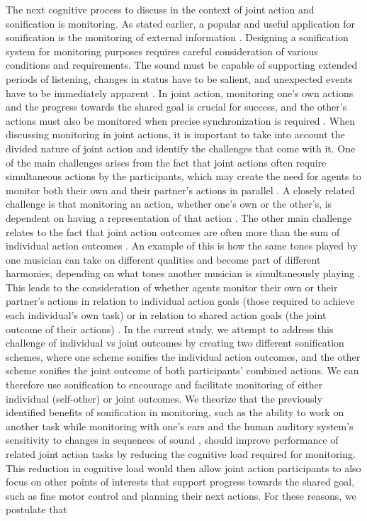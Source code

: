 \documentclass[10pt,a4paper,onecolumn]{article}
\begin{document}
The next cognitive process to discuss in the context of joint action and sonification is monitoring. As stated earlier, a popular and useful application for sonification is the monitoring of external information \autocite{dubusSystematicReviewMapping2013}. Designing a sonification system for monitoring purposes requires careful consideration of various conditions and requirements. The sound must be capable of supporting extended periods of listening, changes in status have to be salient, and unexpected events have to be immediately apparent \autocite{kimotoDesignImplementationStetho2002}. In joint action, monitoring one's own actions and the progress towards the shared goal is crucial for success, and the other's actions must also be monitored when precise synchronization is required \autocite{vesperMinimalArchitectureJoint2010}. When discussing monitoring in joint actions, it is important to take into account the divided nature of joint action and identify the challenges that come with it. One of the main challenges arises from the fact that joint actions often require simultaneous actions by the participants, which may create the need for agents to monitor both their own and their partner's actions in parallel \autocite{loehrMonitoringIndividualJoint2013}. A closely related challenge is that monitoring an action, whether one's own or the other's, is dependent on having a representation of that action \autocite{knoblichPsychologicalResearchJoint2011}. The other main challenge relates to the fact that joint action outcomes are often more than the sum of individual action outcomes \autocite{loehrMonitoringIndividualJoint2013}. An example of this is how the same tones played by one musician can take on different qualities and become part of different harmonies, depending on what tones another musician is simultaneously playing \autocite{loehrMonitoringIndividualJoint2013}. This leads to the consideration of whether agents monitor their own or their partner's actions in relation to individual action goals (those required to achieve each individual's own task) or in relation to shared action goals (the joint outcome of their actions) \autocite{loehrMonitoringIndividualJoint2013}. In the current study, we attempt to address this challenge of individual vs joint outcomes by creating two different sonification schemes, where one scheme sonifies the individual action outcomes, and the other scheme sonifies the joint outcome of both participants' combined actions. We can therefore use sonification to encourage and facilitate monitoring of either individual (self-other) or joint outcomes. We theorize that the previously identified benefits of sonification in monitoring, such as the ability to work on another task while monitoring with one's ears \autocite{vickersSonificationProcessMonitoring} and the human auditory system's sensitivity to changes in sequences of sound \autocite{hildebrandtShortPaperEnhancing2014}, should improve performance of related joint action tasks by reducing the cognitive load required for monitoring. This reduction in cognitive load would then allow joint action participants to also focus on other points of interests that support progress towards the shared goal, such as fine motor control and planning their next actions. For these reasons, we postulate that 
\end{document}

